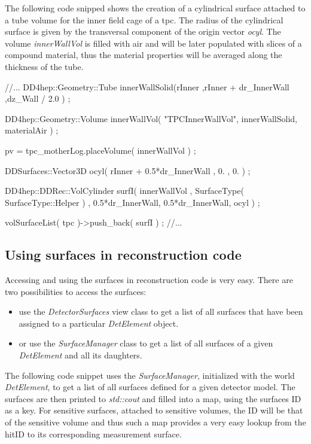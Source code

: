 \documentclass[10pt,a4paper]{article}
\begin{document}
\noindent
The following code snipped shows the creation of a cylindrical surface attached
to a tube volume for the inner field cage of a tpc. The radius of the cylindrical
surface is given by the transversal component of the origin vector {\em ocyl}.
The volume {\em innerWallVol} is filled with air and will be later populated
with slices of a compound material, thus the material properties will be
averaged along the thickness of the tube.

\begin{code}
  //...
  DD4hep::Geometry::Tube innerWallSolid(rInner ,rInner + dr_InnerWall ,dz_Wall / 2.0 ) ;

  DD4hep::Geometry::Volume innerWallVol( "TPCInnerWallVol", innerWallSolid, materialAir ) ; 

  pv = tpc_motherLog.placeVolume( innerWallVol ) ;

  DDSurfaces::Vector3D ocyl(  rInner + 0.5*dr_InnerWall , 0. , 0. ) ;

  DD4hep::DDRec::VolCylinder surfI( innerWallVol , 
                                    SurfaceType( SurfaceType::Helper ) ,
                                    0.5*dr_InnerWall, 0.5*dr_InnerWall, 
                                    ocyl ) ;

  volSurfaceList( tpc )->push_back(  surfI ) ;
  //...
\end{code}




\subsection{Using surfaces in reconstruction code}
\label{subsec:ddrec-surfaces-reconstruction}
Accessing and using the surfaces in reconstruction code is very easy. 
There are two possibilities to access the surfaces:
\begin{itemize}
\item use the {\em DetectorSurfaces} view class to get a list of 
 all surfaces that have been assigned to a particular {\em DetElement}
 object.
\item or use the {\em SurfaceManager} class to get a list of all
 surfaces of a given {\em DetElement} and all its daughters.
\end{itemize}

\noindent
The following code snippet uses the {\em SurfaceManager}, initialized
with the world  {\em DetElement}, to get a list of all surfaces 
defined for a given detector model.
The surfaces are then printed to {\em std::cout} and filled 
into a map, using the surfaces ID as a key.
For sensitive surfaces, attached to sensitive volumes, the ID
will be that of the sensitive volume and thus such a map provides
a very easy lookup from the hitID to its corresponding measurement
surface.
\end{document}
